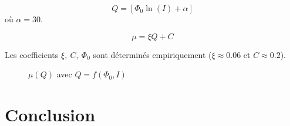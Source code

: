 \documentclass[a4paper,12pt]{report}
\begin{document}
\[
Q = \left[ \Phi_0  \ln \left( I \right) + \alpha \right]
\]
où $\alpha = 30$.

\[
\mu = \xi Q + C
\]

Les coefficients $\xi,\ C,\ \Phi_0$ sont déterminés empiriquement ($\xi \approx 0.06$ et $C \approx 0.2$).

\begin{figure}
    \centering
    {\small
        
    }
    \caption{$\mu(Q)$ avec $Q = f(\Phi_0, I)$}
\end{figure}

\chapter{Conclusion}



\end{document}
